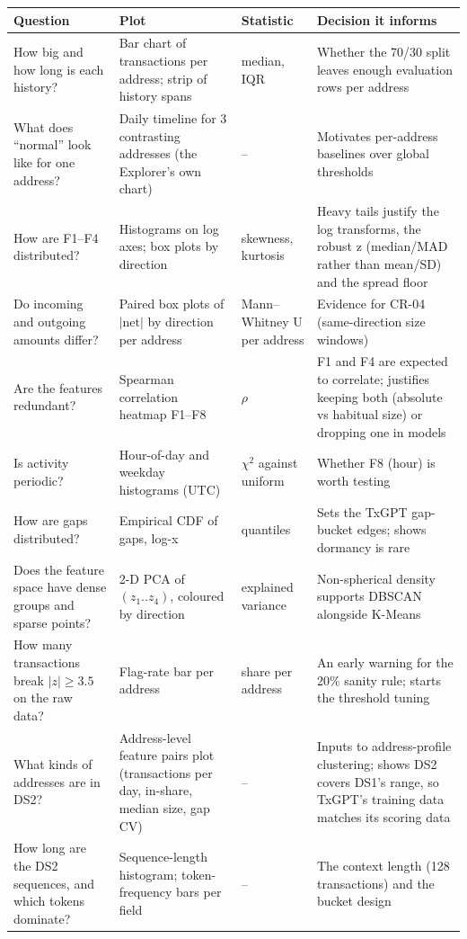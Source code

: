 \begin{longtable}{@{}L{3.6cm}L{3.4cm}L{3.0cm}L{4.4cm}@{}}
\toprule
\textbf{Question} & \textbf{Plot} & \textbf{Statistic} & \textbf{Decision it informs} \\
\midrule
\endhead
How big and how long is each history? & Bar chart of transactions per address; strip of history spans & median, IQR & Whether the 70/30 split leaves enough evaluation rows per address \\
What does ``normal'' look like for one address? & Daily timeline for 3 contrasting addresses (the Explorer's own chart) & -- & Motivates per-address baselines over global thresholds \\
How are F1--F4 distributed? & Histograms on log axes; box plots by direction & skewness, kurtosis & Heavy tails justify the log transforms, the robust z (median/MAD rather than mean/SD) and the spread floor \\
Do incoming and outgoing amounts differ? & Paired box plots of $|\text{net}|$ by direction per address & Mann--Whitney U per address & Evidence for CR-04 (same-direction size windows) \\
Are the features redundant? & Spearman correlation heatmap F1--F8 & $\rho$ & F1 and F4 are expected to correlate; justifies keeping both (absolute vs habitual size) or dropping one in models \\
Is activity periodic? & Hour-of-day and weekday histograms (UTC) & $\chi^2$ against uniform & Whether F8 (hour) is worth testing \\
How are gaps distributed? & Empirical CDF of gaps, log-x & quantiles & Sets the TxGPT gap-bucket edges; shows dormancy is rare \\
Does the feature space have dense groups and sparse points? & 2-D PCA of $(z_1..z_4)$, coloured by direction & explained variance & Non-spherical density supports DBSCAN alongside K-Means \\
How many transactions break $|z| \geq 3.5$ on the raw data? & Flag-rate bar per address & share per address & An early warning for the 20\% sanity rule; starts the threshold tuning \\
What kinds of addresses are in DS2? & Address-level feature pairs plot (transactions per day, in-share, median size, gap CV) & -- & Inputs to address-profile clustering; shows DS2 covers DS1's range, so TxGPT's training data matches its scoring data \\
How long are the DS2 sequences, and which tokens dominate? & Sequence-length histogram; token-frequency bars per field & -- & The context length (128 transactions) and the bucket design \\
\bottomrule
\end{longtable}

